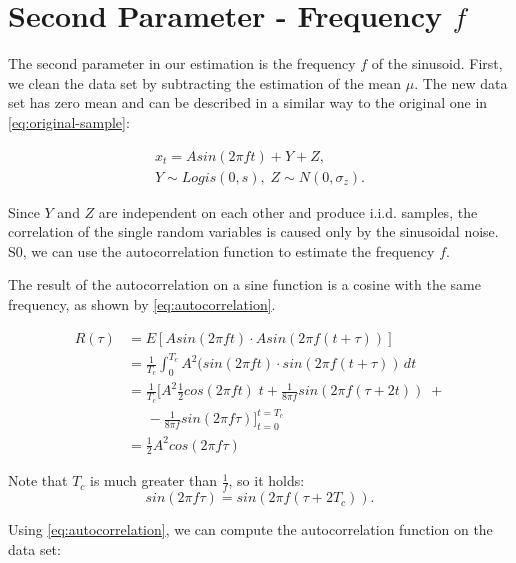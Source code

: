 \section{Second Parameter - Frequency $f$}
\label{sec:frequency}

The second parameter in our estimation is the frequency $f$ of the sinusoid.
First, we clean the data set by subtracting the estimation of the mean $\mu$. 
The new data set has zero mean and can be described in a similar way to the original one in \cref{eq:original-sample}:

\begin{equation*}
    \begin{gathered}
        x_{t} = A sin(2 \pi f t) + Y + Z, \\
        Y \sim Logis(0, s), \; Z \sim N(0, \sigma_{z}).
    \end{gathered}
\end{equation*}

Since $Y$ and $Z$ are independent on each other and produce \ac{i.i.d.} samples, the correlation of the single random variables is caused only by the sinusoidal noise.
S0, we can use the autocorrelation function to estimate the frequency $f$.

The result of the autocorrelation on a sine function is a cosine with the same frequency, as shown by \cref{eq:autocorrelation}.

\begin{equation}
    \begin{split}
        R(\tau) &= E[A sin(2\pi ft) \cdot A sin(2\pi f(t+\tau))] \\
        &= \frac{1}{T_c} \int_{0}^{T_c} A^2(sin(2\pi f t) \cdot sin(2\pi f (t+\tau )) \, dt \\
        &= \frac{1}{T_c} \bigg[ A^2 \frac{1}{2} cos(2\pi ft) \; t + \frac{1}{8\pi f} sin(2\pi f(\tau+2t)) \; + \\
        &\;\;\;\;\; - \frac{1}{8\pi f} sin(2\pi f\tau) \bigg]_{t=0}^{t=T_c} \\
        &= \frac{1}{2} A^2 cos(2\pi f\tau)
    \end{split}
    \label{eq:autocorrelation}
\end{equation}

Note that $T_c$ is much greater than $\frac{1}{f}$, so it holds:
$$ sin(2 \pi f \tau) = sin(2 \pi f (\tau + 2 T_c)). $$

Using \cref{eq:autocorrelation}, we can compute the autocorrelation function on the data set:

